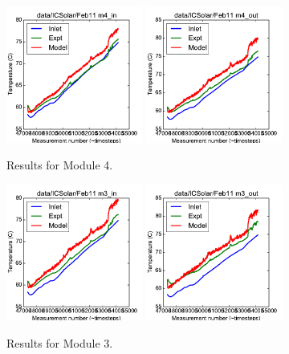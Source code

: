 \documentclass{article}
\begin{document}
\clearpage
\begin{figure}[!ht]
\centering
\includegraphics[width=0.4\textwidth]{../../data/ICSolar/images/Feb11_m4_in_unsteady.pdf}\hspace{0.05\textwidth}
\includegraphics[width=0.4\textwidth]{../../data/ICSolar/images/Feb11_m4_out_unsteady.pdf}\hspace{0.05\textwidth}\\
\caption{Results for Module 4.}\end{figure}
\begin{figure}[!ht]
\centering
\includegraphics[width=0.4\textwidth]{../../data/ICSolar/images/Feb11_m3_in_unsteady.pdf}\hspace{0.05\textwidth}
\includegraphics[width=0.4\textwidth]{../../data/ICSolar/images/Feb11_m3_out_unsteady.pdf}\hspace{0.05\textwidth}\\
\caption{Results for Module 3.}\end{figure}
\end{document}
